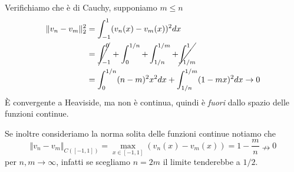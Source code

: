 \documentclass[10pt,a4paper,twoside,openright]{book}
\begin{document}
Verifichiamo che è di Cauchy, supponiamo $\displaystyle m\leqslant n$
\begin{align*}
\Vert v_{n} -v_{m}\Vert ^{2}_{2} & =\int ^{1}_{-1}(v_{n}(x) -v_{m}(x))^{2} dx\\
 & =\cancel{\int ^{0}_{-1}} +\int ^{1/n}_{0} +\int ^{1/m}_{1/n} +\cancel{\int ^{1}_{1/m}}\\
 & =\int ^{1/n}_{0}(n-m)^{2} x^{2} dx+\int ^{1/m}_{1/n}(1-mx)^{2} dx\rightarrow 0
\end{align*}
È convergente a Heaviside, ma non è continua, quindi è \textit{fuori} dallo spazio delle funzioni continue.

Se inoltre consideriamo la norma solita delle funzioni continue notiamo che
\begin{equation*}
\Vert v_{n} -v_{m}\Vert _{C([ -1,1])} =\max_{x\in [ -1,1]}(v_{n}(x) -v_{m}(x)) =1-\frac{m}{n} \nrightarrow 0
\end{equation*}
per $n,m\rightarrow \infty $, infatti se scegliamo $\displaystyle n=2m$ il limite tenderebbe a $\displaystyle 1/2$.
\end{document}
